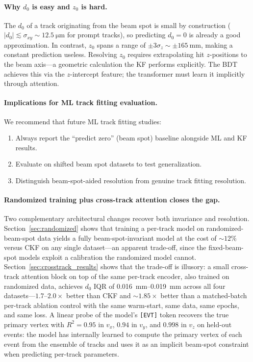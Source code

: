 \documentclass[11pt]{article}
\begin{document}
\paragraph{Why $d_0$ is easy and $z_0$ is hard.}
The $d_0$ of a track originating from the beam spot is small by construction ($|d_0| \lesssim \sigma_{xy} \sim \SI{12.5}{\micro\metre}$ for prompt tracks), so predicting $d_0 = 0$ is already a good approximation.
In contrast, $z_0$ spans a range of $\pm 3\sigma_z \sim \pm\SI{165}{\milli\metre}$, making a constant prediction useless.
Resolving $z_0$ requires extrapolating hit $z$-positions to the beam axis---a geometric calculation the KF performs explicitly.
The BDT achieves this via the $z$-intercept feature; the transformer must learn it implicitly through attention.

\paragraph{Implications for ML track fitting evaluation.}
We recommend that future ML track fitting studies:
\begin{enumerate}
    \item Always report the ``predict zero'' (beam spot) baseline alongside ML and KF results.
    \item Evaluate on shifted beam spot datasets to test generalization.
    \item Distinguish beam-spot-aided resolution from genuine track fitting resolution.
\end{enumerate}

\paragraph{Randomized training plus cross-track attention closes the gap.}
Two complementary architectural changes recover both invariance and resolution.
Section~\ref{sec:randomized} shows that training a per-track model on randomized-beam-spot data yields a fully beam-spot-invariant model at the cost of $\sim 12\%$ versus CKF on any single dataset---an apparent trade-off, since the fixed-beam-spot models exploit a calibration the randomized model cannot.
Section~\ref{sec:crosstrack_results} shows that the trade-off is illusory: a small cross-track attention block on top of the same per-track encoder, also trained on randomized data, achieves $d_0$ IQR of \SI{0.016}{\milli\metre}--\SI{0.019}{\milli\metre} across all four datasets---$1.7$--$2.0\times$ better than CKF and $\sim 1.85\times$ better than a matched-batch per-track ablation control with the same warm-start, same data, same epochs, and same loss.
A linear probe of the model's \texttt{[EVT]} token recovers the true primary vertex with $R^2 = 0.95$ in $v_x$, $0.94$ in $v_y$, and $0.998$ in $v_z$ on held-out events: the model has internally learned to compute the primary vertex of each event from the ensemble of tracks and uses it as an implicit beam-spot constraint when predicting per-track parameters.
\end{document}
